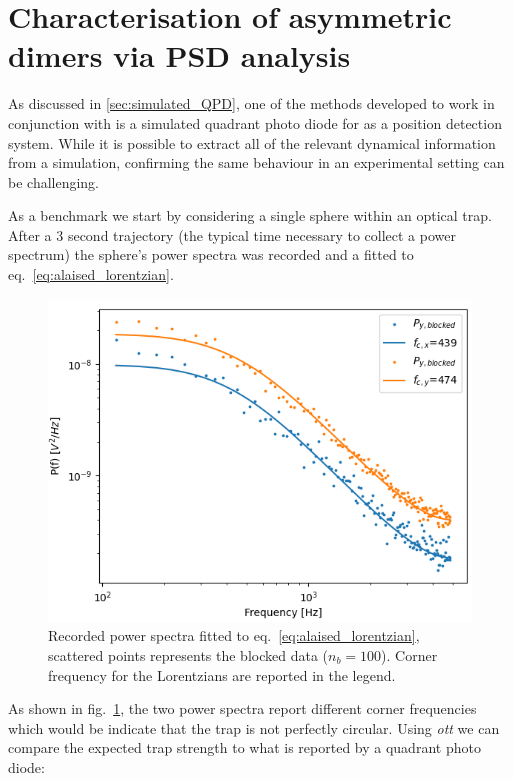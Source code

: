 \section{Characterisation of asymmetric dimers via PSD analysis}
As discussed in \ref{sec:simulated_QPD}, one of the methods
developed to work in conjunction with \cite{Vigilante2020} is 
a simulated quadrant photo diode for as a position detection
system. While it is possible to extract all of the relevant 
dynamical information from a simulation, confirming the same 
behaviour in an experimental setting can be challenging.

As a benchmark we start by considering a single sphere within 
an optical trap. After a 3 second trajectory (the typical time
necessary to collect a power spectrum) the sphere's power 
spectra was recorded and a fitted to eq.~\ref{eq:alaised_lorentzian}.
\begin{figure}[h]
	\label{fig:psd_sphere}
	\centering
	\includegraphics[width=\linewidth]{PSD_sphere.png}
	\caption{Recorded power spectra fitted to eq.~\ref{eq:alaised_lorentzian}, scattered points represents
	the blocked data ($n_b=100$). Corner frequency for the 
	Lorentzians are reported in the legend.}
\end{figure} 

As shown in fig.~\ref{fig:psd_sphere}, the two power spectra
report different corner frequencies which would be indicate 
that the trap is not perfectly circular. Using \textit{ott} 
we can compare the expected trap strength to what is reported
by a quadrant photo diode:

